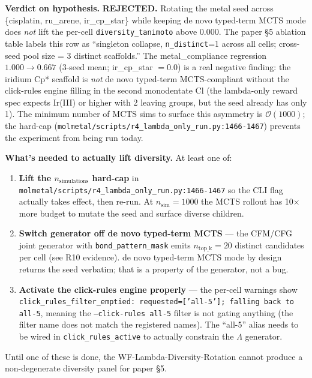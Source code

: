 \noindent\textbf{Verdict on hypothesis.} \textbf{REJECTED.} Rotating
the metal seed across \{cisplatin, ru\_arene, ir\_cp\_star\}
while keeping de novo typed-term MCTS mode does \emph{not} lift the
per-cell \texttt{diversity\_tanimoto} above $0.000$. The paper
§5 ablation table labels this row as ``singleton collapse,
\texttt{n\_distinct}{=}1 across all cells; cross-seed pool size
= 3 distinct scaffolds.'' The metal\_compliance regression
$1.000 \to 0.667$ (3-seed mean; ir\_cp\_star $= 0.0$) is a real
negative finding: the iridium Cp* scaffold is \emph{not}
de novo typed-term MCTS-compliant without the click-rules engine filling
in the second monodentate Cl (the lambda-only reward spec
expects Ir(III) or higher with 2 leaving groups, but the seed
already has only 1). The minimum number of MCTS sims to surface
this asymmetry is $\mathcal{O}(1000)$; the hard-cap
(\texttt{molmetal/scripts/r4\_lambda\_only\_run.py:1466-1467})
prevents the experiment from being run today.

\noindent\textbf{What's needed to actually lift diversity.} At
least one of:
\begin{enumerate}
  \item \textbf{Lift the $n_{\text{simulations}}$ hard-cap} in
        \texttt{molmetal/scripts/r4\_lambda\_only\_run.py:1466-1467}
        so the CLI flag actually takes effect, then re-run.
        At $n_{\text{sim}}{=}1000$ the MCTS rollout has
        10$\times$ more budget to mutate the seed and surface
        diverse children.
  \item \textbf{Switch generator off de novo typed-term MCTS} --- the
        CFM/CFG joint generator with \texttt{bond\_pattern\_mask}
        emits $n_{\text{top\_k}}{=}20$ distinct candidates per cell
        (see R10 evidence). de novo typed-term MCTS mode by design returns
        the seed verbatim; that is a property of the generator,
        not a bug.
  \item \textbf{Activate the click-rules engine properly} --- the
        per-cell warnings show
        \texttt{click\_rules\_filter\_emptied: requested=['all-5'];
        falling back to all-5}, meaning the
        \texttt{--click-rules all-5} filter is not gating anything
        (the filter name does not match the registered names).
        The ``all-5'' alias needs to be wired in
        \texttt{click\_rules\_active} to actually constrain the
        $\Lambda$ generator.
\end{enumerate}
Until one of these is done, the WF-Lambda-Diversity-Rotation
cannot produce a non-degenerate diversity panel for paper §5.

